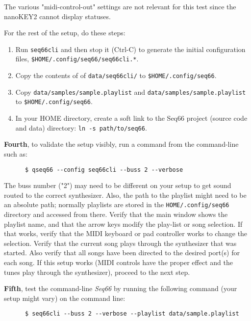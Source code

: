    The various "midi-control-out" settings are not relevant for this test since
   the nanoKEY2 cannot display statuses.

   For the rest of the setup, do these steps:

   \begin{enumerate}
      \item Run \texttt{seq66cli} and then stop it (Ctrl-C) to generate the
         initial configuration files,
         \texttt{\$HOME/.config/seq66/seq66cli.*}.
      \item Copy the contents of of \texttt{data/seq66cli/} to
         \texttt{\$HOME/.config/seq66}.
      \item Copy \texttt{data/samples/sample.playlist} and
         \texttt{data/samples/sample.playlist} to
         \texttt{\$HOME/.config/seq66}.
      \item In your HOME directory, create a soft link to the Seq66 project
         (source code and data) directory: \texttt{ln -s path/to/seq66}.
   \end{enumerate}

   \textbf{Fourth}, to validate the setup visibly, run a command from the
   command-line such as:

   \begin{verbatim}
      $ qseq66 --config seq66cli --buss 2 --verbose
   \end{verbatim}


   The buss number ("2") may need to be different on your setup to get sound
   routed to the correct synthesizer.  Also, the path to the playlist might
   need to be an absolute path; normally playlists are stored in the
   \texttt{HOME/.config/seq66} directory and accessed from there.
   Verify that the main window shows the playlist name, and that the arrow keys
   modify the play-list or song selection.  If that works, verify that the MIDI
   keyboard or pad controller works to change the selection.
   Verify that the current song plays through the synthesizer that was started.
   Also verify that all songs have been directed to the desired port(s) for
   each song.
   If this setup works (MIDI controls have the proper effect and the tunes play
   through the synthesizer), proceed to the next step.

   \textbf{Fifth}, test the command-line \textsl{Seq66} by running the
   following command (your setup might vary) on the command line:

   \begin{verbatim}
      $ seq66cli --buss 2 --verbose --playlist data/sample.playlist
   \end{verbatim}

